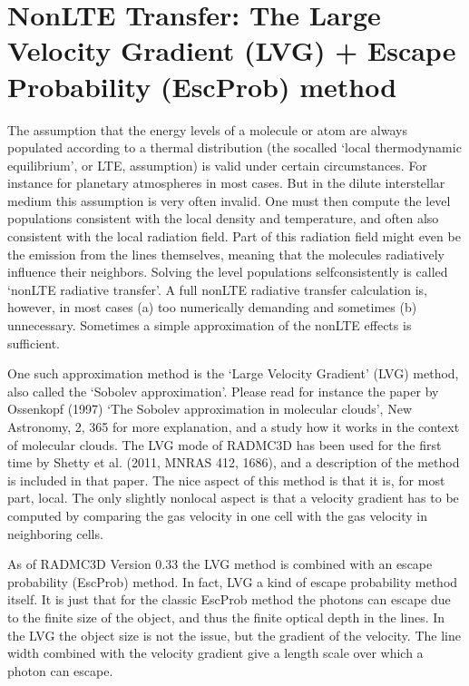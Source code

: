 \documentclass[letterpaper,10pt,english]{sphinxmanual}
\begin{document}
\section{Non\sphinxhyphen{}LTE Transfer: The Large Velocity Gradient (LVG) + Escape Probability (EscProb) method}
\label{\detokenize{lineradtrans:non-lte-transfer-the-large-velocity-gradient-lvg-escape-probability-escprob-method}}\label{\detokenize{lineradtrans:sec-lvg}}
The assumption that the energy levels of a molecule or atom are always
populated according to a thermal distribution (the so\sphinxhyphen{}called ‘local
thermodynamic equilibrium’, or LTE, assumption) is valid under certain
circumstances. For instance for planetary atmospheres in most cases.  But in
the dilute interstellar medium this assumption is very often invalid.  One
must then compute the level populations consistent with the local density
and temperature, and often also consistent with the local radiation
field. Part of this radiation field might even be the emission from the
lines themselves, meaning that the molecules radiatively influence their
neighbors. Solving the level populations self\sphinxhyphen{}consistently is called
‘non\sphinxhyphen{}LTE radiative transfer’. A full non\sphinxhyphen{}LTE radiative transfer
calculation is, however, in most cases (a) too numerically demanding and
sometimes (b) unnecessary. Sometimes a simple approximation of the non\sphinxhyphen{}LTE
effects is sufficient.

One such approximation method is the ‘Large Velocity Gradient’ (LVG)
method, also called the ‘Sobolev approximation’.  Please read for instance
the paper by Ossenkopf (1997) ‘The Sobolev approximation in molecular
clouds’, New Astronomy, 2, 365 for more explanation, and a study how it
works in the context of molecular clouds. The LVG mode of RADMC\sphinxhyphen{}3D has been
used for the first time by Shetty et al. (2011, MNRAS 412, 1686), and a
description of the method is included in that paper.  The nice aspect of
this method is that it is, for most part, local. The only slightly non\sphinxhyphen{}local
aspect is that a velocity gradient has to be computed by comparing the gas
velocity in one cell with the gas velocity in neighboring cells.

As of RADMC\sphinxhyphen{}3D Version 0.33 the LVG method is combined with an escape
probability (EscProb) method. In fact, LVG  a kind of escape probability
method itself. It is just that for the classic EscProb method the photons can
escape due to the finite size of the object, and thus the finite optical
depth in the lines. In the LVG the object size is not the issue, but the
gradient of the velocity. The line width combined with the velocity gradient
give a length scale over which a photon can escape.
\end{document}
